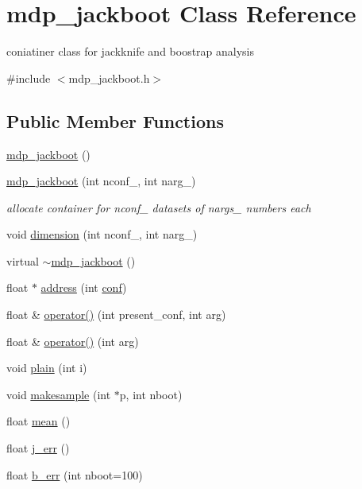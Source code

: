 \hypertarget{classmdp__jackboot}{}\section{mdp\+\_\+jackboot Class Reference}
\label{classmdp__jackboot}


coniatiner class for jackknife and boostrap analysis  




{\ttfamily \#include $<$mdp\+\_\+jackboot.\+h$>$}

\subsection*{Public Member Functions}
\begin{DoxyCompactItemize}
\item 
\hyperlink{classmdp__jackboot_a7cb2ed899f90ecc23bd0a4eecf15e8d9}{mdp\+\_\+jackboot} ()
\item 
\hyperlink{classmdp__jackboot_a528121e64281ffc30843b720f7c6354a}{mdp\+\_\+jackboot} (int nconf\+\_\+, int narg\+\_)
\begin{DoxyCompactList}\small\item\em allocate container for nconf\+\_\+ datasets of nargs\+\_\+ numbers each \end{DoxyCompactList}\item 
void \hyperlink{classmdp__jackboot_a452de46122e421b055d02c381fc88c58}{dimension} (int nconf\+\_\+, int narg\+\_)
\item 
virtual \hyperlink{classmdp__jackboot_aff3993d59a2c97e449e79da8dfdbbe86}{$\sim$mdp\+\_\+jackboot} ()
\item 
float $\ast$ \hyperlink{classmdp__jackboot_a0eac202baa5532ede856af6f616ab9d9}{address} (int \hyperlink{classmdp__jackboot_ae84ce36555fb3089989232ca91d80e15}{conf})
\item 
float \& \hyperlink{classmdp__jackboot_a7533621a114d565f0c26bcc3ca0df1bb}{operator()} (int present\+\_\+conf, int arg)
\item 
float \& \hyperlink{classmdp__jackboot_a1bfb073e7933a0ff34d8f50743e1d695}{operator()} (int arg)
\item 
void \hyperlink{classmdp__jackboot_a56e5206388f943a9fee3d4d2eea3b2ae}{plain} (int i)
\item 
void \hyperlink{classmdp__jackboot_add5b0171b18a4befe8e526aaf5b30477}{makesample} (int $\ast$p, int nboot)
\item 
float \hyperlink{classmdp__jackboot_ae1d3c643754c88be40ac1957ac4db685}{mean} ()
\item 
float \hyperlink{classmdp__jackboot_aa594e64f4e7155684e2d23f1f7ba2b5d}{j\+\_\+err} ()
\item 
float \hyperlink{classmdp__jackboot_a4d4841252e62815d7242cb440c6e49c0}{b\+\_\+err} (int nboot=100)
\end{DoxyCompactItemize}
